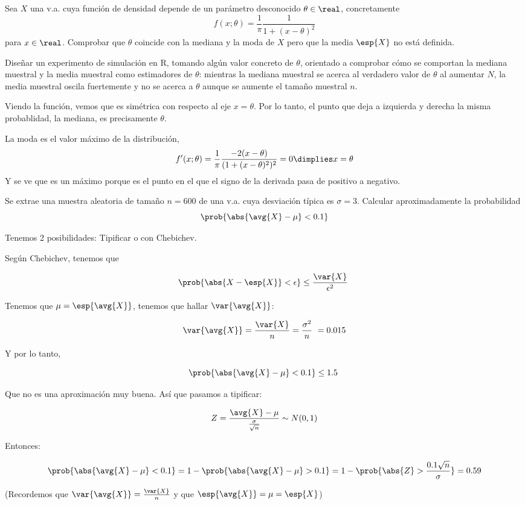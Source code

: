 \begin{problem}[5] Sea $X$ una v.a. cuya función de densidad depende de un parámetro desconocido $\theta \in \real$, concretamente
\[ f(x;\theta) = \frac{1}{\pi}\frac{1}{1+(x-\theta)^2} \]
para $x\in \real$. Comprobar que $\theta$ coincide con la mediana y la moda de $X$ pero que la media $\esp{X}$ no está definida.

Diseñar un experimento de simulación en R, tomando algún valor concreto de $\theta$, orientado a comprobar cómo se comportan la mediana muestral y la media muestral como estimadores de $\theta$: mientras la mediana muestral se acerca al verdadero valor de $\theta$ al aumentar $N$, la media muestral oscila fuertemente y no se acerca a $\theta$ aunque se aumente el tamaño muestral $n$.

\solution Viendo la función, vemos que es simétrica con respecto al eje $x= \theta$. Por lo tanto, el punto que deja a izquierda y derecha la misma probablidad, la mediana, es precisamente $\theta$. 

La moda es el valor máximo de la distribución,
\[ f'(x;\theta) = \frac{1}{\pi} \frac{-2(x-\theta)}{(1+(x-\theta)^2)^2} = 0 \dimplies x = \theta \]
Y se ve que es un máximo porque es el punto en el que el signo de la derivada pasa de positivo a negativo.
\end{problem}

\begin{problem}[6]
Se extrae una muestra aleatoria de tamaño $n = 600$ de una v.a. cuya desviación típica es $\sigma = 3$.
Calcular aproximadamente la probabilidad
\[\prob{\abs{\avg{X} - \mu} < 0.1}\]

\solution
Tenemos 2 posibilidades: Tipificar o con Chebichev.

Según Chebichev, tenemos que 

\[ \prob{\abs{X - \esp{X}} < \epsilon} \leq \frac{\var{X}}{\epsilon^2} \]

Tenemos que $\mu = \esp{\avg{X}}$, tenemos que hallar $\var{\avg{X}}$:

\[ \var{\avg{X}} = \frac{\var{X}}{n} = \frac{\sigma^2}{n} = 0.015 \]

Y por lo tanto,

\[ \prob{\abs{\avg{X} - \mu} < 0.1} \leq 1.5 \]

Que no es una aproximación muy buena. Así que pasamos a tipificar:

\[ Z = \frac{\avg{X} - \mu}{\frac{\sigma}{\sqrt{n}}} \sim N(0,1) \]

Entonces:

\[
\prob{\abs{\avg{X} - \mu} < 0.1} =
1 - \prob{\abs{\avg{X} - \mu} > 0.1} =
1 - \prob{\abs{Z} > \frac{0.1\sqrt{n}}{\sigma}} =
0.59
\] 

(Recordemos que $\var{\avg{X}} = \frac{\var{X}}{n}$ y que $\esp{\avg{X}} = \mu = \esp{X}$)

\end{problem}


